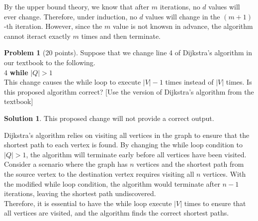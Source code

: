 \documentclass{article}
\theoremstyle{definition}
\newtheorem{problem}{Problem}
\newtheorem*{solution}{Solution}
\begin{document}
\noindent
By the upper bound theory, we know that after $m$ iterations, no $d$ values will ever change.
Therefore, under induction, no $d$ values will change in the $(m+1)$-th iteration.  
However, since the $m$ value is not knowsn in advance, the algorithm cannot iteract exactly $m$ times and then terminate.

\begin{problem}[20 points]
Suppose that we change line 4 of Dijkstra’s algorithm in our textbook
to the following.\\[1ex]
4 \textbf{while} $|Q| > 1$ \\[1ex] 
This change causes the while loop to execute $|V|-1$ times instead of
$|V |$ times. Is this proposed algorithm correct?
[Use the version of Dijkstra's algorithm from the textbook]
\end{problem}
\begin{solution}
This proposed change will not provide a correct output.

\noindent
Dijkstra's algorithm relies on visiting all vertices in the graph to ensure that the shortest path to each vertex is found. By changing the while loop condition to $|Q|>1$, the algorithm will terminate early before all vertices have been visited.\\

\noindent
Consider a scenario where the graph has $n$ vertices and the shortest path from the source vertex to the destination vertex requires visiting all $n$ vertices. With the modified while loop condition, the algorithm would terminate after $n-1$ iterations, leaving the shortest path undiscovered.\\

\noindent
Therefore, it is essential to have the while loop execute $|V|$ times to ensure that all vertices are visited, and the algorithm finds the correct shortest paths.
\end{solution}
\end{document}
